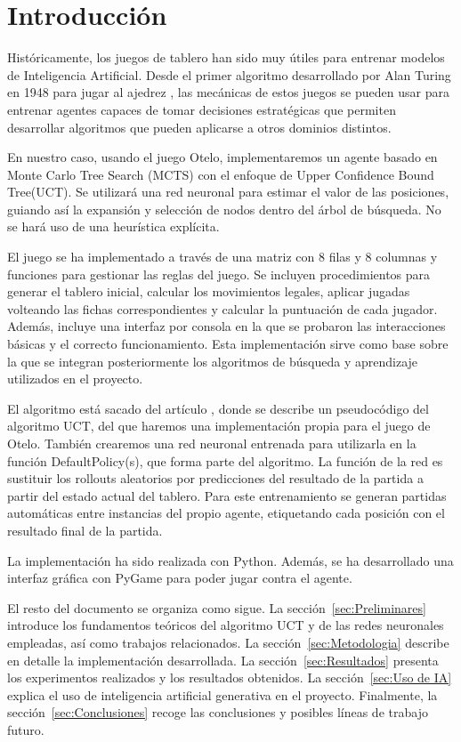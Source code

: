 \documentclass[conference,a4paper]{IEEEtran}
\begin{document}
\section{Introducción}

Históricamente, los juegos de tablero han sido muy útiles para entrenar modelos de Inteligencia Artificial. Desde el primer algoritmo desarrollado por Alan Turing en 1948 para jugar al ajedrez \cite{b1}, las mecánicas de estos juegos se pueden usar para entrenar agentes capaces de tomar decisiones estratégicas que permiten desarrollar algoritmos que pueden aplicarse a otros dominios distintos. 

En nuestro caso, usando el juego Otelo, implementaremos un agente basado en Monte Carlo Tree Search (MCTS) con el enfoque de Upper Confidence Bound Tree(UCT). Se utilizará una red neuronal para estimar el valor de las posiciones, guiando así la expansión y selección de nodos dentro del árbol de búsqueda. No se hará uso de una heurística explícita.

El juego se ha implementado a través de una matriz con 8 filas y 8 columnas y funciones para gestionar las reglas del juego. Se incluyen procedimientos para generar el tablero inicial, calcular los movimientos legales, aplicar jugadas volteando las fichas correspondientes y calcular la puntuación de cada jugador. Además, incluye una interfaz por consola en la que se probaron las interacciones básicas y el correcto funcionamiento. Esta implementación sirve como base sobre la que se integran posteriormente los algoritmos de búsqueda y aprendizaje utilizados en el proyecto.

El algoritmo está sacado del artículo \cite{b2}, donde se describe un pseudocódigo del algoritmo UCT, del que haremos una implementación propia para el juego de Otelo. También crearemos una red neuronal entrenada para utilizarla en la función DefaultPolicy(s), que forma parte del algoritmo. La función de la red es sustituir los rollouts aleatorios por predicciones del resultado de la partida a partir del estado actual del tablero. Para este entrenamiento se generan partidas automáticas entre instancias del propio agente, etiquetando cada posición con el resultado final de la partida.

La implementación ha sido realizada con Python. Además, se ha desarrollado una interfaz gráfica con PyGame para poder jugar contra el agente.

El resto del documento se organiza como sigue. La sección~\ref{sec:Preliminares} introduce los fundamentos teóricos del algoritmo UCT y de las redes neuronales empleadas, así como trabajos relacionados. La sección~\ref{sec:Metodologia} describe en detalle la implementación desarrollada. La sección~\ref{sec:Resultados} presenta los experimentos realizados y los resultados obtenidos. La sección~\ref{sec:Uso de IA} explica el uso de inteligencia artificial generativa en el proyecto. Finalmente, la sección~\ref{sec:Conclusiones} recoge las conclusiones y posibles líneas de trabajo futuro. 
\end{document}
